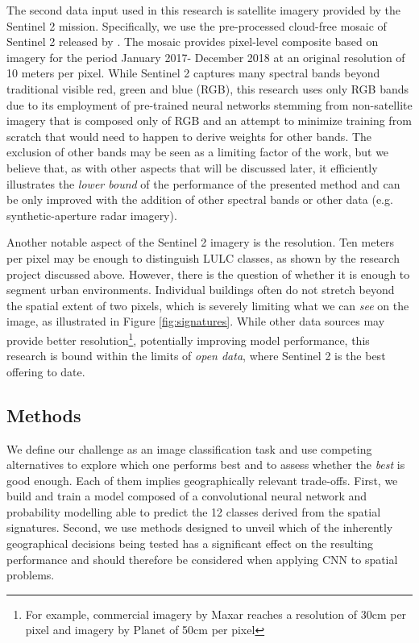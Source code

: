 
The second data input used in this research is satellite imagery provided by the
Sentinel 2 mission. Specifically, we use the pre-processed cloud-free mosaic of Sentinel
2 released by \cite{CORBANE2020105737}.
The mosaic provides pixel-level composite based on imagery for the period January 2017-
December 2018 at an original resolution of 10 meters per pixel. While Sentinel 2
captures many spectral bands beyond traditional visible red, green and blue (RGB), this
research uses only RGB bands due to its employment of pre-trained neural networks
stemming from non-satellite imagery that is composed only of RGB and an attempt to
minimize training from scratch that would need to happen to derive weights for other bands. The exclusion of other
bands may be seen as a limiting factor of the work, but we believe that, as with other
aspects that will be discussed later, it efficiently illustrates the \textit{lower
bound} of the performance of the presented method and can be only improved with the addition of
other spectral bands or other data (e.g. synthetic-aperture radar imagery).

Another notable aspect of the Sentinel 2 imagery is the resolution. Ten meters per pixel
may be enough to distinguish LULC classes, as shown by the research project discussed
above. However, there is the question of whether it is enough to segment urban
environments. Individual buildings often do not stretch beyond the spatial extent of two
pixels, which is severely limiting what we can \textit{see} on the image, as illustrated
in Figure \ref{fig:signatures}. While other data sources may provide better
resolution\footnote{For example, commercial imagery by Maxar reaches a resolution of
30cm per pixel and imagery by Planet of 50cm per pixel}, potentially improving model
performance, this research is bound within the limits of \textit{open data}, where
Sentinel 2 is the best offering to date.


\subsection{Methods}


We define our challenge as an image classification task and use competing alternatives
to explore which one performs best and to assess whether the \textit{best} is good enough.
Each of them implies geographically relevant
trade-offs. First, we build and train a model composed of a convolutional neural network
and probability modelling able to predict the 12 classes derived from the spatial
signatures. Second, we use methods designed to unveil which of the inherently
geographical decisions being tested has a significant effect on the resulting
performance and should therefore be considered when applying CNN to spatial
problems.

